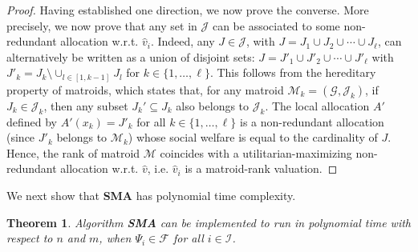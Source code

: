 \documentclass[]{article}
\newtheorem{theorem}{Theorem}
\newcommand{\items}{\mathcal{G}}
\newcommand{\internal}{\mathcal{I}}
\newcommand{\fair}{\mathcal{F}}
\begin{document}
\begin{proof}
Having established one direction, we now prove the converse. More precisely, we now prove that any set in $\mathcal{J}$ can be associated to some non-redundant allocation w.r.t. $\hat{v}_i$. Indeed, any $J \in \mathcal{J}$,  with $J = J_1 \cup J_2 \cup \cdots \cup J_\ell$, can alternatively be written as a union of disjoint sets: $J = J'_1 \cup J'_2 \cup \cdots \cup J'_\ell$ with $J'_k = J_k \setminus \cup_{l \in [1, k-1]} J_{l}$ for $k \in \{1,\ldots,\ell\}$. This follows from the hereditary property of matroids, which states that, for any matroid $\mathcal{M}_k = (\items, \mathcal{J}_k)$, if $J_k \in \mathcal{J}_k$, then any subset $J_k' \subseteq J_k$ also belongs to $\mathcal{J}_k$. The local allocation $A'$ defined by $A'(x_k) = J'_k$ for all $k \in \{1,\ldots,\ell\}$ is a non-redundant allocation (since $J'_k$ belongs to $\mathcal{M}_k$) whose social welfare is equal to the cardinality of $J$. Hence, the rank of matroid $\mathcal{M}$ coincides with a utilitarian-maximizing non-redundant allocation w.r.t. $\hat{v}$, i.e. $\hat{v}_i$ is a matroid-rank valuation. 
\end{proof}

We next show that \textbf{SMA} has polynomial time complexity. 

\begin{theorem} \label{theorem: sma terminates}
Algorithm {\bf SMA} can be implemented to run in polynomial time with respect to $n$ and $m$, when $\Psi_i \in \fair$ for all $i \in \internal$.
\end{theorem}
\end{document}
